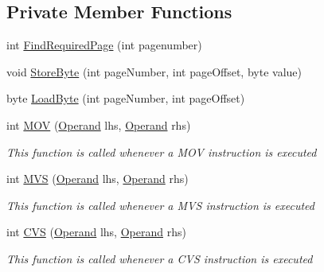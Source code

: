 \subsection*{Private Member Functions}
\begin{DoxyCompactItemize}
\item 
int \hyperlink{class_c_p_u___o_s___simulator_1_1_c_p_u_1_1_instruction_ae0e0e21063eeb9aa0dc0896e6e4c71dc}{Find\+Required\+Page} (int pagenumber)
\item 
void \hyperlink{class_c_p_u___o_s___simulator_1_1_c_p_u_1_1_instruction_a469a6252b1205ff79c93c2d75cafe0ce}{Store\+Byte} (int page\+Number, int page\+Offset, byte value)
\item 
byte \hyperlink{class_c_p_u___o_s___simulator_1_1_c_p_u_1_1_instruction_a494843084219f295941d08e8b0355050}{Load\+Byte} (int page\+Number, int page\+Offset)
\item 
int \hyperlink{class_c_p_u___o_s___simulator_1_1_c_p_u_1_1_instruction_af6548da603e7370f10de03e0da040a24}{M\+O\+V} (\hyperlink{class_c_p_u___o_s___simulator_1_1_c_p_u_1_1_operand}{Operand} lhs, \hyperlink{class_c_p_u___o_s___simulator_1_1_c_p_u_1_1_operand}{Operand} rhs)
\begin{DoxyCompactList}\small\item\em This function is called whenever a M\+O\+V instruction is executed \end{DoxyCompactList}\item 
int \hyperlink{class_c_p_u___o_s___simulator_1_1_c_p_u_1_1_instruction_a33723518d4e117877d2ecf5b861d2eb2}{M\+V\+S} (\hyperlink{class_c_p_u___o_s___simulator_1_1_c_p_u_1_1_operand}{Operand} lhs, \hyperlink{class_c_p_u___o_s___simulator_1_1_c_p_u_1_1_operand}{Operand} rhs)
\begin{DoxyCompactList}\small\item\em This function is called whenever a M\+V\+S instruction is executed \end{DoxyCompactList}\item 
int \hyperlink{class_c_p_u___o_s___simulator_1_1_c_p_u_1_1_instruction_a689065741dc51ddacf955b3781570546}{C\+V\+S} (\hyperlink{class_c_p_u___o_s___simulator_1_1_c_p_u_1_1_operand}{Operand} lhs, \hyperlink{class_c_p_u___o_s___simulator_1_1_c_p_u_1_1_operand}{Operand} rhs)
\begin{DoxyCompactList}\small\item\em This function is called whenever a C\+V\+S instruction is executed \end{DoxyCompactList}\item 

\end{DoxyCompactItemize}
